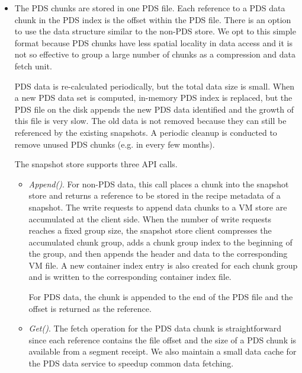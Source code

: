 \begin{itemize}
\item The PDS chunks are  stored in one PDS file. 
Each reference to a PDS data chunk in the PDS index is the offset within the PDS file.
There is an option to use the data structure similar to the non-PDS store. We opt to this simple format because
PDS chunks have less spatial locality in data access and it is not so effective to group a large number of chunks
as a compression and data fetch unit. 

PDS data is re-calculated periodically, but 
the total data size is small.  When
a new PDS data  set is computed, in-memory PDS index is replaced, but 
the PDS file on the disk appends the  new PDS data identified and the growth of this file is very slow. 
The old data is not removed because they can still be referenced by the existing snapshots. 
A periodic cleanup is conducted  to remove unused PDS chunks (e.g. in every few months). 


The snapshot  store supports three API calls.
\begin{itemize}
\item {\em Append()}. For non-PDS data, this call places a chunk into 
the snapshot store and returns a reference to be stored in 
the recipe metadata of a snapshot. 
The write requests to append data chunks to a VM store are accumulated at the client side. 
When the number of write requests reaches a fixed group size, the snapshot store client compresses
the accumulated   chunk group, adds a chunk group index  to the beginning of the group, and then
appends the header and data  to the corresponding VM file.
A new container  index entry is also created for each chunk group and is written to the corresponding
container index file.

For PDS data, the chunk is appended to the end of the PDS file and the offset is returned as the  reference.
\item{\em Get()}.
The fetch operation for the PDS data chunk is straightforward since each reference contains 
the file offset and the size of a PDS chunk is available from a segment receipt.
We also maintain a small data cache for the PDS data service to speedup common data fetching.


\end{itemize}
\end{itemize}
